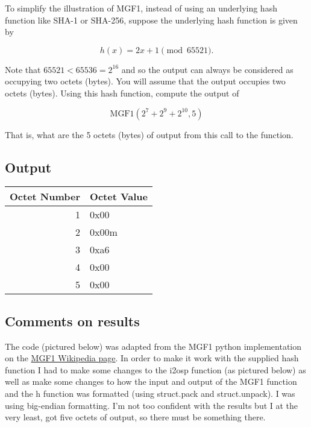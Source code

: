 \documentclass[12pt, letterpaper]{article}
\begin{document}
\medskip
To simplify the illustration of MGF1, instead of using an underlying hash function like SHA-1 or SHA-256, suppose the underlying hash function is given by

\[ h(x) = 2x + 1  \pmod {65521}. \] 

Note that $65521 < 65536 = 2^{16}$ and so the output can always be considered as occupying two octets (bytes). You will assume that the output occupies two octets (bytes). Using this hash function, compute the output of 

\[  \textrm{MGF1}(2^7+2^9+2^{10}, 5) \]

That is, what are the 5 octets (bytes) of output from this call to the function. 

\subsection{Output}
\begin{center}
	\begin{tabular}{|r|l|}
		\hline
		\textbf{Octet Number}	&\textbf{Octet Value} 	\\ \hline
		1	&0x00	\\
		2	&0x00m	\\
		3	&0xa6	\\
		4	&0x00	\\
		5	&0x00	\\
		\hline
	\end{tabular}
\end{center}

\subsection{Comments on results}

The code (pictured below) was adapted from the MGF1 python implementation on the \href{https://en.wikipedia.org/wiki/Mask\_generation\_function\#Example\_Code}{MGF1 Wikipedia page}. In order to make it work with the supplied hash function I had to make some changes to the i2osp function (as pictured below) as well as make some changes to how the input and output of the MGF1 function and the h function was formatted (using struct.pack and struct.unpack). I was using big-endian formatting. I'm not too confident with the results but I at the very least, got five octets of output, so there must be something there.

\newpage
\end{document}
